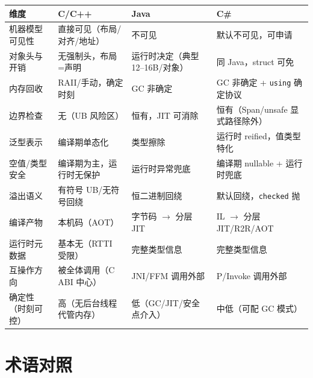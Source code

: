 \documentclass[12pt,a4paper,fontset=fandol]{ctexbook}
\newcommand{\Cplus}[1]{C++\,#1}
\begin{document}
{\small
\begin{longtable}{@{}>{\raggedright\arraybackslash}p{}>{\raggedright\arraybackslash}p{}>{\raggedright\arraybackslash}p{}>{\raggedright\arraybackslash}p{}@{}}
\toprule
\textbf{维度} & \textbf{C/\allowbreak{}\Cplus{}} & \textbf{Java} & \textbf{C\#} \\
\midrule
机器模型可见性 & 直接可见（布局/对齐/地址） & 不可见 & 默认不可见，可申请 \\
对象头与开销 & 无强制头，布局=声明 & 运行时决定（典型 12--16B/对象） & 同 Java，struct 可免 \\
内存回收 & RAII/手动，确定时刻 & GC 非确定 & GC 非确定 + \texttt{using} 确定协议 \\
边界检查 & 无（UB 风险区） & 恒有，JIT 可消除 & 恒有（Span/unsafe 显式路径除外） \\
泛型表示 & 编译期单态化 & 类型擦除 & 运行时 reified，值类型特化 \\
空值/类型安全 & 编译期为主，运行时无保护 & 运行时异常兜底 & 编译期 nullable + 运行时兜底 \\
溢出语义 & 有符号 UB/无符号回绕 & 恒二进制回绕 & 默认回绕，\texttt{checked} 抛 \\
编译产物 & 本机码（AOT） & 字节码 $\to$ 分层 JIT & IL $\to$ 分层 JIT/R2R/AOT \\
运行时元数据 & 基本无（RTTI 受限） & 完整类型信息 & 完整类型信息 \\
互操作方向 & 被全体调用（C ABI 中心） & JNI/FFM 调用外部 & P/Invoke 调用外部 \\
确定性（时刻可控） & 高（无后台线程代管内存） & 低（GC/JIT/安全点介入） & 中低（可配 GC 模式） \\
\bottomrule
\end{longtable}
}

\chapter{术语对照}
\end{document}
